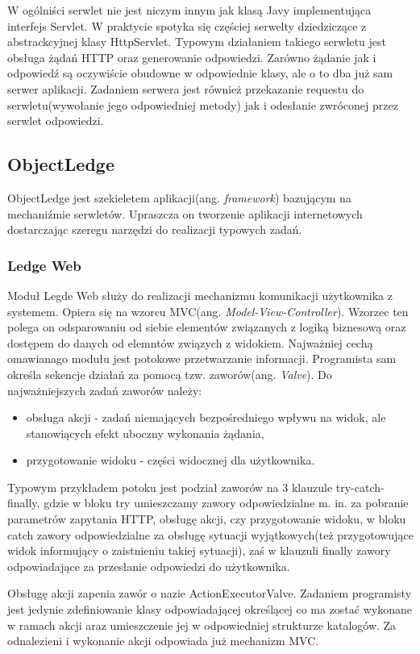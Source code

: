 W ogólniści serwlet nie jest niczym innym jak klasą Javy implementująca interfejs Servlet. W praktycie spotyka się częściej serwelty dziedziczące z abstrackcyjnej klasy HttpServlet. Typowym działaniem takiego serwletu jest obsługa żądań HTTP oraz generowanie odpowiedzi. Zarówno żądanie jak i odpowiedź są oczywiście obudowne w odpowiednie klasy, ale o to dba już sam serwer aplikacji. Zadaniem serwera jest również przekazanie requestu do serwletu(wywołanie jego odpowiedniej metody) jak i odesłanie zwróconej przez serwlet odpowiedzi.

\subsection[ObjectLedge][ObjectLedge]{ObjectLedge}
ObjectLedge jest szekieletem aplikacji(ang. \textit{framework}) bazującym na mechaniźmie serwletów. Upraszcza on tworzenie aplikacji internetowych dostarczając szeregu narzędzi do realizacji typowych zadań.

\subsubsection{Ledge Web}
Moduł Legde Web służy do realizacji mechanizmu komunikacji użytkownika z systemem. Opiera się na wzorcu MVC(ang. \textit{Model-View-Controller}). Wzorzec ten polega on odsparowaniu od siebie elementów związanych z logiką biznesową oraz dostępem do danych od elemntów związych z widokiem. Najważniej cechą omawianago modułu jest potokowe przetwarzanie informacji. Programista sam określa sekencje działań za pomocą tzw. zaworów(ang. \textit{Valve}). Do najważniejszych zadań zaworów należy:
\begin{itemize}
	\item obsługa akcji - zadań niemających bezpośredniego wpływu na widok, ale stanowiących efekt uboczny wykonania żądania,
	\item przygotowanie widoku - części widocznej dla użytkownika.
\end{itemize}
Typowym przykładem potoku jest podział zaworów na 3 klauzule try-catch-finally, gdzie w bloku try umieszczamy zawory odpowiedzialne m. in. za pobranie parametrów zapytania HTTP, obsługę akcji, czy przygotowanie widoku, w bloku catch zawory odpowiedzialne za obsługę sytuacji wyjątkowych(też przygotowujące widok informujący o zaistnieniu takiej sytuacji), zaś w klauzuli finally zawory odpowiadające za przesłanie odpowiedzi do użytkownika.

Obsługę akcji zapenia zawór o nazie ActionExecutorValve. Zadaniem programisty jest jedynie zdefiniowanie klasy odpowiadającej określącej co ma zostać wykonane w ramach akcji araz umieszczenie jej w odpowiedniej strukturze katalogów. Za odnalezieni i wykonanie akcji odpowiada już mechanizm MVC.

